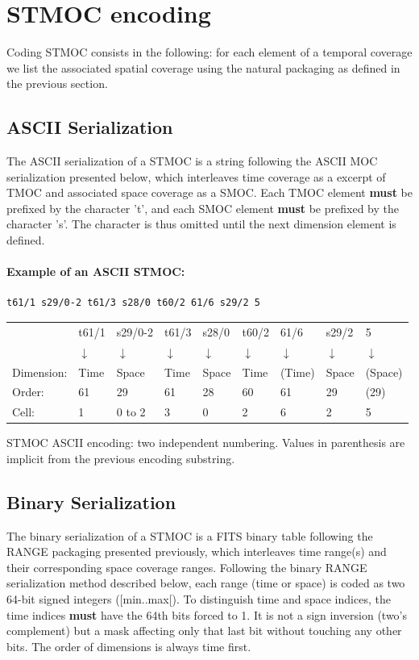 \documentclass[11pt,a4paper]{ivoa}
\begin{document}
\section{STMOC encoding}
\label{sec:stmoc}
Coding STMOC consists in the following: for each element of a
temporal coverage we list the associated spatial coverage using the
natural packaging as defined in the previous section. 

\subsection{ASCII Serialization}
The ASCII serialization of a STMOC is a string following the ASCII MOC
serialization presented below, which interleaves time coverage as a
excerpt of TMOC and associated space coverage as a SMOC. Each TMOC
element {\bf must} be prefixed by the character 't', and each SMOC
element {\bf must} be prefixed by the character 's'.
The character is thus omitted until the next dimension element is
defined.

\paragraph{Example of an ASCII STMOC:}
\begin{lstlisting}[]
  t61/1 s29/0-2 t61/3 s28/0 t60/2 61/6 s29/2 5
\end{lstlisting}

\begin{center}
{\small
  \begin{tabular} { l l l l l l l l l }
   & t61/1      & s29/0-2    & t61/3      & s28/0 & t60/2 & 61/6 & s29/2 & 5\\
   & $\downarrow$ & $\downarrow$ & $\downarrow$ & $\downarrow$ & $\downarrow$ & $\downarrow$ & $\downarrow$ & $\downarrow$ \\
Dimension: & Time & Space  & Time  & Space & Time  & (Time) & Space & (Space) \\
Order:     & 61   & 29     & 61    & 28    & 60    & 61     &  29   & (29)\\
Cell:      & 1    & 0 to 2 & 3     & 0     & 2     & 6      &  2    & 5 \\
\end{tabular}}
STMOC ASCII encoding: two independent numbering. Values in parenthesis are implicit from the previous encoding substring.
\end{center}

\subsection{Binary Serialization}
The binary serialization of a STMOC is a FITS binary table following
the RANGE packaging presented previously, which interleaves time range(s)
and their corresponding space coverage ranges. Following the binary
RANGE serialization method described below, each range (time or space)
is coded as two 64-bit signed integers ([min..max[). To distinguish time
and space indices, the time indices {\bf must} have the 64th bits forced
to 1. It is not a sign inversion (two's complement) but a mask affecting
only that last bit without touching any other bits.  The order of
dimensions is always time first.
\end{document}
